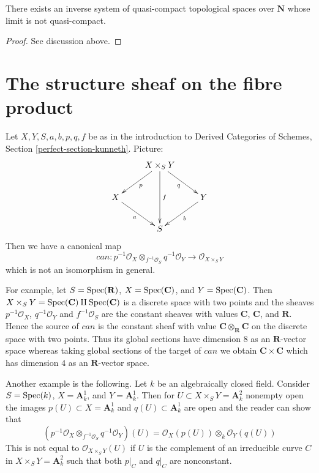 \begin{lemma}
\label{lemma-lim-not-quasi-compact}
There exists an inverse system of quasi-compact topological spaces
over $\mathbf{N}$ whose limit is not quasi-compact.
\end{lemma}

\begin{proof}
See discussion above.
\end{proof}






\section{The structure sheaf on the fibre product}
\label{section-silly}

\noindent
Let $X, Y, S, a, b, p, q, f$ be as in the introduction to
Derived Categories of Schemes,
Section \ref{perfect-section-kunneth}. Picture:
$$
\xymatrix{
& X \times_S Y \ar[ld]^p \ar[rd]_q \ar[dd]^f \\
X \ar[rd]_a & & Y \ar[ld]^b \\
& S
}
$$
Then we have a canonical map
$$
can :
p^{-1}\mathcal{O}_X \otimes_{f^{-1}\mathcal{O}_S} q^{-1}\mathcal{O}_Y
\longrightarrow
\mathcal{O}_{X \times_S Y}
$$
which is not an isomorphism in general.

\medskip\noindent
For example, let $S = \mathop{\mathrm{Spec}}(\mathbf{R})$, $X = \mathop{\mathrm{Spec}}(\mathbf{C})$, and
$Y = \mathop{\mathrm{Spec}}(\mathbf{C})$. Then
$X \times_S Y = \mathop{\mathrm{Spec}}(\mathbf{C}) \amalg \mathop{\mathrm{Spec}}(\mathbf{C})$
is a discrete space with two points
and the sheaves $p^{-1}\mathcal{O}_X$, $q^{-1}\mathcal{O}_Y$
and $f^{-1}\mathcal{O}_S$ are the constant sheaves with values
$\mathbf{C}$, $\mathbf{C}$, and $\mathbf{R}$.
Hence the source of $can$ is the constant sheaf
with value $\mathbf{C} \otimes_\mathbf{R} \mathbf{C}$
on the discrete space with two points. Thus its global
sections have dimension $8$ as an $\mathbf{R}$-vector space
whereas taking global sections of the target of $can$
we obtain $\mathbf{C} \times \mathbf{C}$
which has dimension $4$ as an $\mathbf{R}$-vector space.

\medskip\noindent
Another example is the following. Let $k$ be an algebraically
closed field. Consider
$S = \mathop{\mathrm{Spec}}(k)$, $X = \mathbf{A}^1_k$, and $Y = \mathbf{A}^1_k$.
Then for $U \subset X \times_S Y = \mathbf{A}^2_k$ nonempty open
the images $p(U) \subset X = \mathbf{A}^1_k$ and $q(U) \subset \mathbf{A}^1_k$
are open and the reader can show that
$$
\left(
p^{-1}\mathcal{O}_X \otimes_{f^{-1}\mathcal{O}_S} q^{-1}\mathcal{O}_Y
\right)(U) = \mathcal{O}_X(p(U)) \otimes_k \mathcal{O}_Y(q(U))
$$
This is not equal to $\mathcal{O}_{X \times_S Y}(U)$
if $U$ is the complement of an irreducible curve $C$ in
$X \times_S Y = \mathbf{A}^2_k$ such that both $p|_C$ and $q|_C$
are nonconstant.


